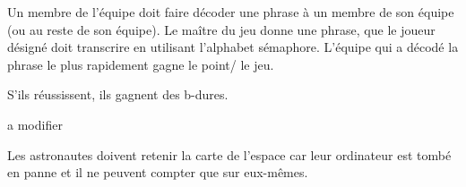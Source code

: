\documentclass{grand-jeu}
\begin{document}
\begin{liste-materiel}
\end{liste-materiel}

\begin{regles}
Un membre de l’équipe doit faire décoder une phrase à un membre de son équipe (ou au reste de son équipe). Le maître du jeu donne une phrase, que le joueur désigné doit transcrire en utilisant l’alphabet sémaphore. L’équipe qui a décodé la phrase le plus rapidement gagne le point/ le jeu. 

S’ils réussissent, ils gagnent des b-dures.
\end{regles}

\begin{imaginaire}
a modifier

Les astronautes doivent retenir la carte de l’espace car leur ordinateur est tombé en panne et il ne peuvent compter que sur eux-mêmes.
\end{imaginaire}

\begin{moments-stop}
\end{moments-stop}
\end{document}
